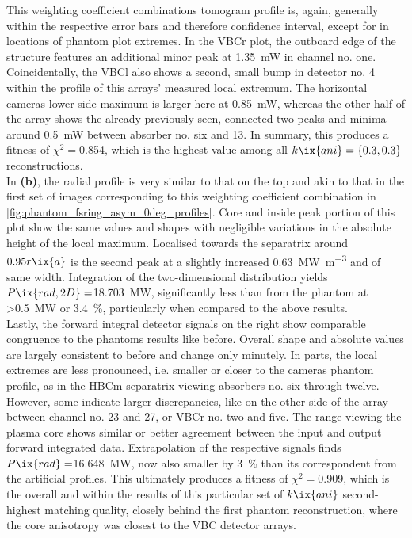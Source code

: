                 This weighting coefficient combinations tomogram profile is, again, generally within the respective error bars and therefore confidence interval, except for in locations of phantom plot extremes. In the VBCr plot, the outboard edge of the structure features an additional minor peak at \SI{1.35}{\milli\watt} in channel no. one. Coincidentally, the VBCl also shows a second, small bump in detector no. 4 within the profile of this arrays' measured local extremum. The horizontal cameras lower side maximum is larger here at \SI{0.85}{\milli\watt}, whereas the other half of the array shows the already previously seen, connected two peaks and minima around \SI{0.5}{\milli\watt} between absorber no. six and 13. In summary, this produces a fitness of $\chi^{2}=$\SI{0.854}{\arbitraryunit}, which is the highest value among all $k\ix{ani}=\left\{0.3, 0.3\right\}$ reconstructions.\\%
                In \textbf{(b)}, the radial profile is very similar to that on the top and akin to that in the first set of images corresponding to this weighting coefficient combination in \cref{fig:phantom_fsring_asym_0deg_profiles}. Core and inside peak portion of this plot show the same values and shapes with negligible variations in the absolute height of the local maximum. Localised towards the separatrix around $0.95r\ix{a}$ is the second peak at a slightly increased \SI{0.63}{\mega\watt\per\cubic\meter} and of same width. Integration of the two-dimensional distribution yields $P\ix{rad,2D}=$\SI{18.703}{\mega\watt}, significantly less than from the phantom at >\SI{0.5}{\mega\watt} or \SI{3.4}{\percent}, particularly when compared to the above results.\\%
                Lastly, the forward integral detector signals on the right show comparable congruence to the phantoms results like before. Overall shape and absolute values are largely consistent to before and change only minutely. In parts, the local extremes are less pronounced, i.e. smaller or closer to the cameras phantom profile, as in the HBCm separatrix viewing absorbers no. six through twelve. However, some indicate larger discrepancies, like on the other side of the array between channel no. 23 and 27, or VBCr no. two and five. The range viewing the plasma core shows similar or better agreement between the input and output forward integrated data. Extrapolation of the respective signals finds $P\ix{rad}=$\SI{16.648}{\mega\watt}, now also smaller by \SI{3}{\percent} than its correspondent from the artificial profiles. This ultimately produces a fitness of $\chi^{2}=$\SI{0.909}{\arbitraryunit}, which is the overall and within the results of this particular set of $k\ix{ani}$ second-highest matching quality, closely behind the first phantom reconstruction, where the core anisotropy was closest to the VBC detector arrays.\\%
